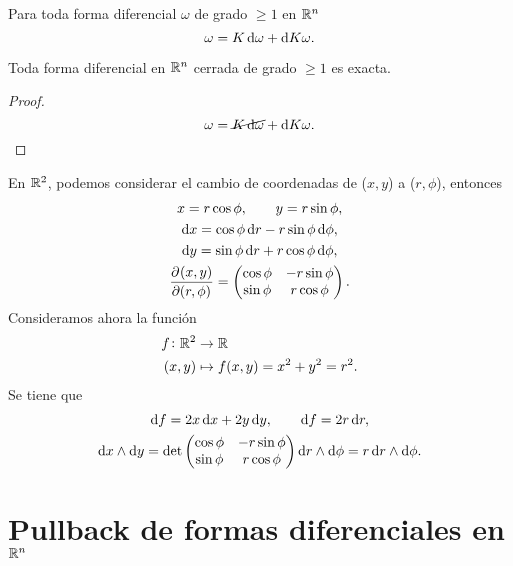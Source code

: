 \begin{lema}
    Para toda forma diferencial $\omega$ de grado $\geq 1$ en $\mathbb{R}^n$
    \[
        \omega = K \dif \omega + \dif K \omega.
    \]
\end{lema}

\begin{teo}
    Toda forma diferencial en $\mathbb{R}^n$ cerrada de grado $\geq 1$ es exacta.
\end{teo}
\begin{proof}
    \[
        \omega = \cancel{K\dif \omega} + \dif K \omega.
    \]
\end{proof}

\begin{example}
    En $\mathbb{R}^2$, podemos considerar el cambio de coordenadas de ($x, y$) a ($r, \phi$), entonces
    \begin{gather*}
        x = r \cos \phi, \qquad y = r \sin \phi, \\
        \dif x = \cos \phi \dif r - r \sin \phi \dif \phi, \\
        \dif y = \sin \phi \dif r + r \cos \phi \dif \phi, \\
        \pdv{(x, y)}{(r, \phi)} =
        \begin{pmatrix}
            \cos \phi & - r \sin \phi \\ \sin \phi & r \cos \phi
        \end{pmatrix}.
    \end{gather*}
    Consideramos ahora la función
    \[
        \begin{aligned}
            f \colon \mathbb{R}^2 &\to \mathbb{R} \\
            (x,y) &\mapsto f(x,y) = x^2 + y^2 = r^2.
        \end{aligned}
    \]
    Se tiene que
    \begin{gather*}
        \dif f = 2x \dif x + 2y \dif y, \qquad \dif f = 2 r \dif r, \\
        \dif x \wedge \dif y = \det
        \begin{pmatrix}
            \cos \phi & - r \sin \phi \\
            \sin \phi &   r \cos \phi
        \end{pmatrix} \dif r \wedge \dif \phi = r \dif r \wedge \dif \phi.
    \end{gather*}
\end{example}

\section{Pullback de formas diferenciales en $\mathbb{R}^n$}


